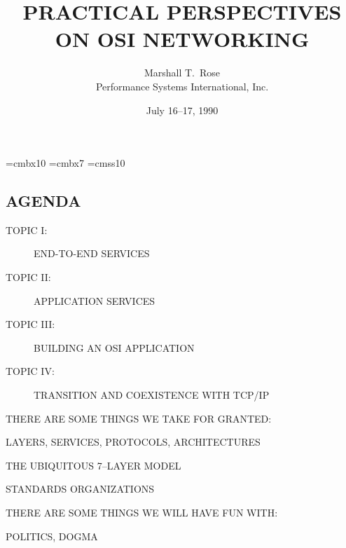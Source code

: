 

\newif\ifpractical	\practicaltrue

\def\emph#1{\underline{#1}}
\def\X/{$\surd$}

\font\xx=cmbx10
\font\yy=cmbx7
\font\sf=cmss10

\raggedright


\let\tradeNAMfont=\relax
\let\tradeORGfont=\relax




\title	{PRACTICAL PERSPECTIVES\\ ON OSI NETWORKING}
\author	{Marshall T.~Rose\\ Performance Systems International, Inc.}
\date	{July 16--17, 1990}
\maketitlepage


\begin{bwslide}\thispagestyle{empty}
\part*	{AGENDA}\bf

\begin{description}
\item[TOPIC I:]		END-TO-END SERVICES

\item[TOPIC II:]	APPLICATION SERVICES

\item[TOPIC III:]	BUILDING AN OSI APPLICATION

\item[TOPIC IV:]	TRANSITION AND COEXISTENCE WITH TCP/IP
\end{description}
\end{bwslide}


\setcounter{slide}{0}
\begin{bwslide}

\begin{nrtc}
\item	THERE ARE SOME THINGS WE TAKE FOR GRANTED:
    \begin{nrtc}
    \item	LAYERS, SERVICES, PROTOCOLS, ARCHITECTURES

    \item	THE UBIQUITOUS 7--LAYER MODEL

    \item	STANDARDS ORGANIZATIONS
    \end{nrtc}

\item	THERE ARE SOME THINGS WE WILL HAVE FUN WITH:
    \begin{nrtc}
    \item	POLITICS, DOGMA
    \end{nrtc}
\end{nrtc}
\end{bwslide}











